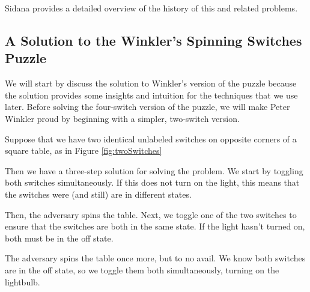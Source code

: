 Sidana \cite{Sidana2020} provides a detailed overview of the history of this
and related problems.

\subsection{A Solution to the Winkler's Spinning Switches Puzzle}

We will start by discuss the solution to Winkler's version of the puzzle because
the solution provides some insights and intuition for the techniques that we use
later. Before solving the four-switch version of the puzzle,
we will make Peter Winkler proud by beginning with a simpler, two-switch version.

\begin{example}
  Suppose that we have two identical unlabeled switches on opposite corners
  of a square table, as in Figure \ref{fig:twoSwitches}

  Then we have a three-step solution for solving the problem. We start by
  toggling both switches simultaneously. If this does not turn on the light,
  this means that the switches were (and still) are in different states.

  Then, the adversary spins the table. Next, we toggle one of the two switches
  to ensure that the switches are both in the same state. If the light hasn't
  turned on, both must be in the off state.

  The adversary spins the table once more, but to no avail. We know both
  switches are in the off state, so we toggle them both simultaneously, turning
  on the lightbulb.
\end{example}

